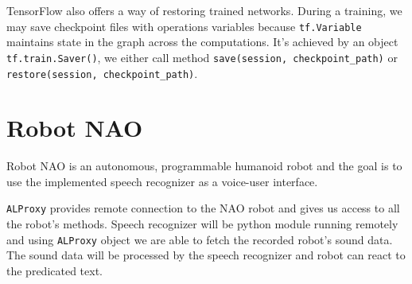TensorFlow also offers a way of restoring trained networks. During a training, we may save checkpoint files with operations variables because \texttt{tf.Variable} maintains state in the graph across the computations.
It's achieved by an object \texttt{tf.train.Saver()}, we either call method \texttt{save(session, checkpoint\_path)} or \texttt{restore(session, checkpoint\_path)}.


\section{Robot NAO}

Robot NAO is an autonomous, programmable humanoid robot and the goal is to use the implemented speech recognizer as a voice-user interface.


\texttt{ALProxy} provides remote connection to the NAO robot and gives us access to all the robot's methods.
Speech recognizer will be python module running remotely and using \texttt{ALProxy} object we are able to fetch the recorded robot's sound data.
The sound data will be processed by the speech recognizer and robot can react to the predicated text.
